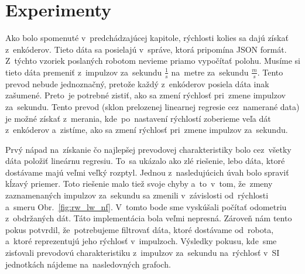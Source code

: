 \section{Experimenty}
\label{sec:experimenty}

Ako bolo spomenuté v~predchádzajúcej kapitole, rýchlosti kolies sa dajú získať z~enkóderov. Tieto dáta sa posielajú v~správe, ktorá pripomína JSON formát.
Z~týchto vzoriek poslaných robotom nevieme priamo vypočítať polohu. Musíme si tieto dáta premeniť z~impulzov za~sekundu \(\frac{1}{s}\) na~metre
za~sekundu \(\frac{m}{s}\). Tento prevod nebude jednoznačný, pretože každý z~enkóderov posiela dáta inak zašumené. Preto~je potrebné zistiť, ako sa zmení
rýchlosť pri~zmene impulzov za~sekundu. Tento prevod (sklon prelozenej linearnej regresie cez~namerané data) je možné získať z~merania, kde~po~nastavení
rýchlostí zoberieme veľa dát z~enkóderov a~zistíme, ako sa zmení rýchlosť pri~zmene impulzov za~sekundu.

Prvý nápad na~získanie čo najlepšej prevodovej charakteristiky bolo cez~všetky dáta položiť lineárnu regresiu. To~sa ukázalo ako zlé riešenie, lebo dáta,
ktoré dostávame majú veľmi veľký rozptyl. Jednou z~nasledujúcich úvah bolo spraviť kĺzavý priemer. Toto riešenie malo tiež svoje chyby a~to~v~tom, že~zmeny
zaznamenaných impulzov za~sekundu sa zmenili v~závislosti od~rýchlosti a~smeru Obr.~\ref{fig:rw_lw_nf}. V~tomto bode sme vyskúšali počítať odometriu
z~obdržaných dát. Táto implementácia bola veľmi nepresná. Zároveň nám tento pokus potvrdil, že~potrebujeme filtrovať dáta, ktoré dostávame
od~robota, a~ktoré reprezentujú jeho rýchlosť v~impulzoch. Výsledky pokusu, kde~sme zisťovali prevodovú charakteristiku z~impulzov za~sekundu na~rýchlosť
v~SI jednotkách nájdeme na~nasledovných grafoch.

